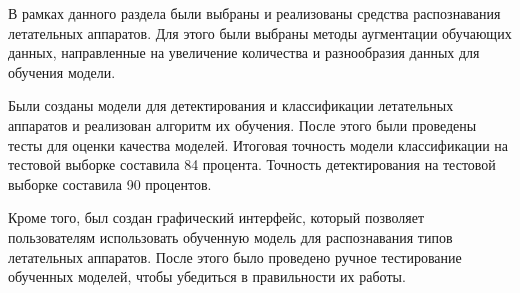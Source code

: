 В рамках данного раздела были выбраны и реализованы средства распознавания летательных аппаратов. Для этого были выбраны методы аугментации обучающих данных, направленные на увеличение количества и разнообразия данных для обучения модели. 

Были созданы модели для детектирования и классификации летательных аппаратов и реализован алгоритм их обучения. После этого были проведены тесты для оценки качества моделей. Итоговая точность модели классификации на тестовой выборке составила 84 процента. Точность детектирования на тестовой выборке составила 90 процентов.

Кроме того, был создан графический интерфейс, который позволяет пользователям использовать обученную модель для распознавания типов летательных аппаратов. После этого было проведено ручное тестирование обученных моделей, чтобы убедиться в правильности их работы.